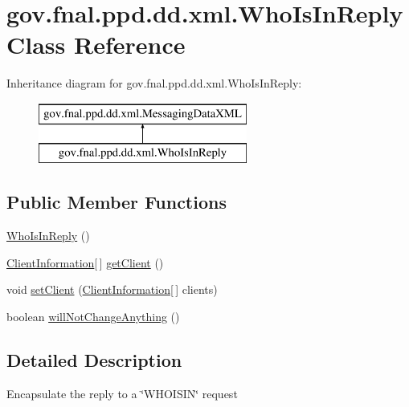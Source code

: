 \hypertarget{classgov_1_1fnal_1_1ppd_1_1dd_1_1xml_1_1WhoIsInReply}{\section{gov.\-fnal.\-ppd.\-dd.\-xml.\-Who\-Is\-In\-Reply Class Reference}
\label{classgov_1_1fnal_1_1ppd_1_1dd_1_1xml_1_1WhoIsInReply}
}
Inheritance diagram for gov.\-fnal.\-ppd.\-dd.\-xml.\-Who\-Is\-In\-Reply\-:\begin{figure}[H]
\begin{center}
\leavevmode
\includegraphics[height=2.000000cm]{classgov_1_1fnal_1_1ppd_1_1dd_1_1xml_1_1WhoIsInReply}
\end{center}
\end{figure}
\subsection*{Public Member Functions}
\begin{DoxyCompactItemize}
\item 
\hyperlink{classgov_1_1fnal_1_1ppd_1_1dd_1_1xml_1_1WhoIsInReply_a71eac2b69aeb56b19c0fef8f919b092a}{Who\-Is\-In\-Reply} ()
\item 
\hyperlink{classgov_1_1fnal_1_1ppd_1_1dd_1_1xml_1_1ClientInformation}{Client\-Information}\mbox{[}$\,$\mbox{]} \hyperlink{classgov_1_1fnal_1_1ppd_1_1dd_1_1xml_1_1WhoIsInReply_aa7844907393346d6e386f498429094f2}{get\-Client} ()
\item 
void \hyperlink{classgov_1_1fnal_1_1ppd_1_1dd_1_1xml_1_1WhoIsInReply_a06690d26645a2d96ffb8c5ad8627cef2}{set\-Client} (\hyperlink{classgov_1_1fnal_1_1ppd_1_1dd_1_1xml_1_1ClientInformation}{Client\-Information}\mbox{[}$\,$\mbox{]} clients)
\item 
boolean \hyperlink{classgov_1_1fnal_1_1ppd_1_1dd_1_1xml_1_1WhoIsInReply_a25569ff0d8b0d145ca887f2d09a8de99}{will\-Not\-Change\-Anything} ()
\end{DoxyCompactItemize}


\subsection{Detailed Description}
Encapsulate the reply to a \char`\"{}\-W\-H\-O\-I\-S\-I\-N\char`\"{} request

